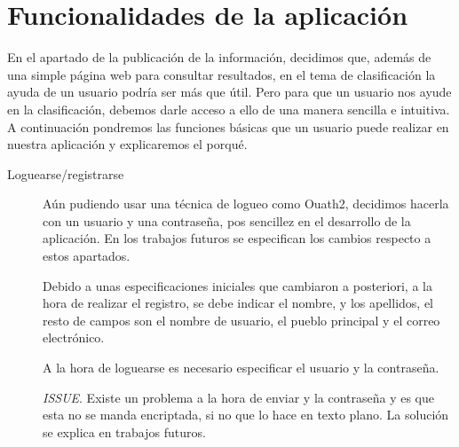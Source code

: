 \section{Funcionalidades de la aplicación}
En el apartado de la publicación de la información, decidimos que, además de una simple página web para consultar resultados, en el tema de clasificación la ayuda de un usuario podría ser más que útil. Pero para que un usuario nos ayude en la clasificación, debemos darle acceso a ello de una manera sencilla e intuitiva. 
A continuación pondremos las funciones básicas que un usuario puede realizar en nuestra aplicación y explicaremos el porqué.

\begin{description}

\item[Loguearse/registrarse]
	
	Aún pudiendo usar una técnica de logueo como Ouath2, decidimos hacerla con un usuario y una contraseña, pos sencillez en el desarrollo de la aplicación. En los trabajos futuros se especifican los cambios respecto a estos apartados.

	Debido a unas especificaciones iniciales que cambiaron a posteriori, a la hora de realizar el registro, se debe indicar el nombre, y los apellidos, el resto de campos son el nombre de usuario, el pueblo principal y el correo electrónico.

	A la hora de loguearse es necesario especificar el usuario y la contraseña.

	\textit{ISSUE}. Existe un problema a la hora de enviar y la contraseña y es que esta no se manda encriptada, si no que lo hace en texto plano. La solución se explica en trabajos futuros.


\end{description}
